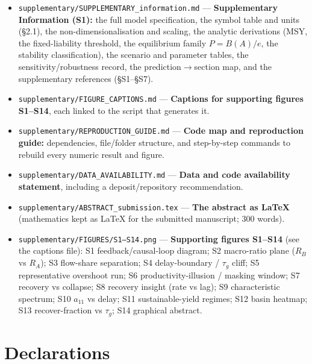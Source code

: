 \documentclass[11pt]{article}
\begin{document}
\begin{itemize}
\item \texttt{supplementary/SUPPLEMENTARY\_information.md} — \textbf{Supplementary Information (S1):} the full model specification, the symbol table and units (§2.1), the non-dimensionalisation and scaling, the analytic derivations (MSY, the fixed-liability threshold, the equilibrium family $P = B(A)/e$, the stability classification), the scenario and parameter tables, the sensitivity/robustness record, the prediction\ensuremath{\to{}}section map, and the supplementary references (§S1–§S7).
\item \texttt{supplementary/FIGURE\_CAPTIONS.md} — \textbf{Captions for supporting figures S1–S14}, each linked to the script that generates it.
\item \texttt{supplementary/REPRODUCTION\_GUIDE.md} — \textbf{Code map and reproduction guide:} dependencies, file/folder structure, and step-by-step commands to rebuild every numeric result and figure.
\item \texttt{supplementary/DATA\_AVAILABILITY.md} — \textbf{Data and code availability statement}, including a deposit/repository recommendation.
\item \texttt{supplementary/ABSTRACT\_submission.tex} — \textbf{The abstract as LaTeX} (mathematics kept as LaTeX for the submitted manuscript; 300 words).
\item \texttt{supplementary/FIGURES/S1–S14.png} — \textbf{Supporting figures S1–S14} (see the captions file): S1 feedback/causal-loop diagram; S2 macro-ratio plane ($R_{B}$ vs $R_{A}$); S3 flow-share separation; S4 delay-boundary / $\tau{}_{g}$ cliff; S5 representative overshoot run; S6 productivity-illusion / masking window; S7 recovery vs collapse; S8 recovery insight (rate vs lag); S9 characteristic spectrum; S10 $a_{11}$ vs delay; S11 sustainable-yield regimes; S12 basin heatmap; S13 recover-fraction vs $\tau{}_{g}$; S14 graphical abstract.
\end{itemize}

\section*{Declarations}
\end{document}
